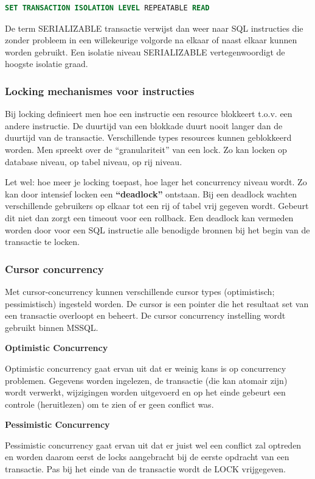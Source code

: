 \documentclass{article}
\newcommand{\bold}[1]{\textbf{#1}}
\begin{document}
\begin{lstlisting}[language=SQL]
SET TRANSACTION ISOLATION LEVEL REPEATABLE READ
\end{lstlisting}

De term SERIALIZABLE transactie verwijst dan weer naar SQL instructies die zonder probleem in een willekeurige
volgorde na elkaar of naast elkaar kunnen worden gebruikt.
Een isolatie niveau SERIALIZABLE vertegenwoordigt de hoogste isolatie graad.

\subsubsection{Locking mechanismes voor instructies}
Bij locking definieert men hoe een instructie een resource blokkeert t.o.v. een andere instructie. 
De duurtijd van een blokkade duurt nooit langer dan de duurtijd van de transactie. Verschillende types resources kunnen
geblokkeerd worden. Men spreekt over de ``granulariteit'' van een lock. Zo kan locken op database niveau, op tabel
niveau, op rij niveau.

Let wel: hoe meer je locking toepast, hoe lager het concurrency niveau wordt. Zo kan door intensief locken een
\bold{``deadlock''} ontstaan. Bij een deadlock wachten verschillende gebruikers op elkaar tot een rij of tabel vrij gegeven
wordt. Gebeurt dit niet dan zorgt een timeout voor een rollback. Een deadlock kan vermeden worden door voor een
SQL instructie alle benodigde bronnen bij het begin van de transactie te locken.

\subsubsection{Cursor concurrency}

Met cursor-concurrency kunnen verschillende cursor types (optimistisch; pessimistisch) ingesteld worden. De cursor
is een pointer die het resultaat set van een transactie overloopt en beheert. De cursor concurrency instelling wordt
gebruikt binnen MSSQL.

\bold{Optimistic Concurrency}

Optimistic concurrency gaat ervan uit dat er weinig kans is op concurrency problemen. Gegevens
worden ingelezen, de transactie (die kan atomair zijn) wordt verwerkt, wijzigingen worden
uitgevoerd en op het einde gebeurt een controle (heruitlezen) om te zien of er geen conflict was.

\bold{Pessimistic Concurrency}

Pessimistic concurrency gaat ervan uit dat er juist wel een conflict zal optreden en worden daarom
eerst de locks aangebracht bij de eerste opdracht van een transactie. Pas bij het einde van de
transactie wordt de LOCK vrijgegeven.
\end{document}

